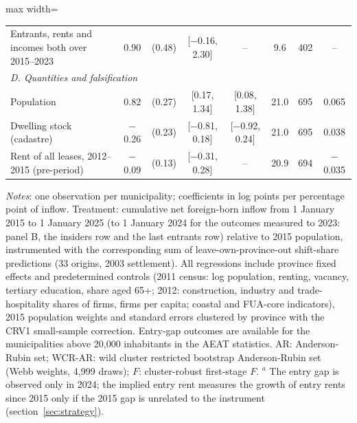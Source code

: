 \begin{table}[!htbp]
\begin{adjustbox}{max width=\linewidth}
\begin{tabular}{lccccccc}
Entrants, rents and incomes both over 2015--2023 & 0.90 & (0.48) & [$-$0.16, 2.30] & -- & 9.6 & 402 & --\\
\multicolumn{8}{l}{\textit{D. Quantities and falsification}}\\
Population & 0.82 & (0.27) & [0.17, 1.34] & [0.08, 1.38] & 21.0 & 695 & 0.065\\
Dwelling stock (cadastre) & $-$0.26 & (0.23) & [$-$0.81, 0.18] & [$-$0.92, 0.24] & 21.0 & 695 & 0.038\\
Rent of all leases, 2012--2015 (pre-period) & $-$0.09 & (0.13) & [$-$0.31, 0.28] & -- & 20.9 & 694 & $-$0.035\\
\bottomrule\end{tabular}\end{adjustbox}
\begin{minipage}{0.97\linewidth}\footnotesize\vspace{4pt}
\textit{Notes}: one observation per municipality; coefficients in log points per percentage point of inflow. Treatment: cumulative net foreign-born inflow from 1 January 2015 to 1 January 2025 (to 1 January 2024 for the outcomes measured to 2023: panel B, the insiders row and the last entrants row) relative to 2015 population, instrumented with the corresponding sum of leave-own-province-out shift-share predictions (33 origins, 2003 settlement). All regressions include province fixed effects and predetermined controls (2011 census: log population, renting, vacancy, tertiary education, share aged 65+; 2012: construction, industry and trade-hospitality shares of firms, firms per capita; coastal and FUA-core indicators), 2015 population weights and standard errors clustered by province with the CRV1 small-sample correction. Entry-gap outcomes are available for the municipalities above 20,000 inhabitants in the AEAT statistics. AR: Anderson-Rubin set; WCR-AR: wild cluster restricted bootstrap Anderson-Rubin set (Webb weights, 4,999 draws); $F$: cluster-robust first-stage $F$. $^a$ The entry gap is observed only in 2024; the implied entry rent measures the growth of entry rents since 2015 only if the 2015 gap is unrelated to the instrument (section~\ref{sec:strategy}).
\end{minipage}\end{table}